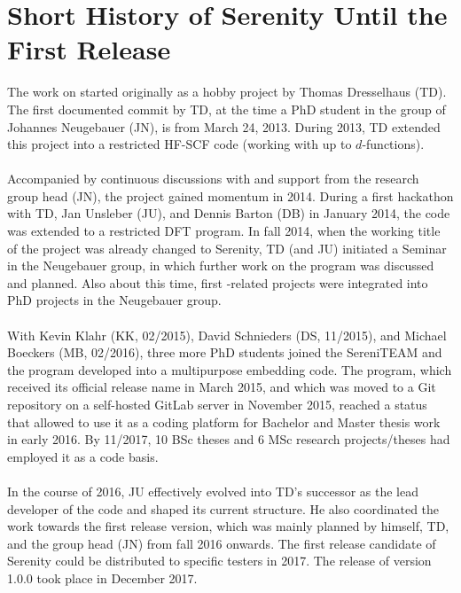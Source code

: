 \chapter{Short History of Serenity Until the First Release}

The work on \serenity started originally as a hobby project
by Thomas Dresselhaus (TD). The first
documented commit by TD, at the time a PhD student in the group of
Johannes Neugebauer (JN), is from March 24, 2013. During 2013,
TD extended this project into a restricted HF-SCF code
(working with up to $d$-functions).\\
\\
Accompanied by continuous discussions with and support from the
research group head (JN), the project gained
momentum in 2014. During a first hackathon with TD, Jan Unsleber (JU),
and Dennis Barton (DB) in January 2014, the code was extended to a
restricted DFT program. In fall 2014, when the working title of the
project was already changed to Serenity, TD (and JU) initiated a
\serenity Seminar in the Neugebauer group, in which further work
on the program was discussed and planned. Also about this time,
first \serenity-related projects were integrated into PhD projects
in the Neugebauer group.\\
\\
With Kevin Klahr (KK, 02/2015), David Schnieders (DS, 11/2015), and Michael
Boeckers (MB, 02/2016), three more PhD students joined the SereniTEAM and
the program developed into a multipurpose embedding code.
The program, which received its official release name in March 2015, and
which was moved to a Git repository on a self-hosted GitLab server in
November 2015, reached a status that allowed to use it as a coding
platform for Bachelor and Master thesis work in early 2016. By 11/2017,
10 BSc theses and 6 MSc research projects/theses had employed it as
a code basis.\\
\\
In the course of 2016, JU effectively evolved into TD's successor as the
lead developer of the code and shaped its current structure. He also
coordinated the work towards the first release version, which was mainly
planned by himself, TD, and the group head (JN) from fall 2016 onwards.
The first release candidate of Serenity could be distributed to specific
testers in 2017. The release of version 1.0.0 took place in December 2017.